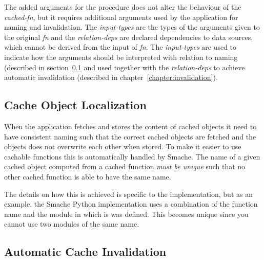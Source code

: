 The added arguments for the procedure does not alter the behaviour of the \emph{cached-fn}, but it requires additional arguments used by the application for naming and invalidation. The \emph{input-types} are the types of the arguments given to the original \emph{fn} and the \emph{relation-deps} are declared dependencies to data sources, which cannot be derived from the input of \emph{fn}. The \emph{input-types} are used to indicate how the arguments should be interpreted with relation to naming (described in section~\ref{subsec:cache-object-localization} and used together with the \emph{relation-deps} to achieve automatic invalidation (described in chapter~\ref{chapter:invalidation}).

\subsection{Cache Object Localization}
\label{subsec:cache-object-localization}

When the application fetches and stores the content of cached objects it need to have consistent naming such that the correct cached objects are fetched and the objects does not overwrite each other when stored. To make it easier to use cachable functions this is automatically handled by Smache. The name of a given cached object computed from a cached function \emph{must be unique} such that no other cached function is able to have the same name.

The details on how this is achieved is specific to the implementation, but as an example, the Smache Python implementation uses a combination of the function name and the module in which is was defined. This becomes unique since you cannot use two modules of the same name.






\subsection{Automatic Cache Invalidation}
\label{subsec:automatic_cache_invalidation}

